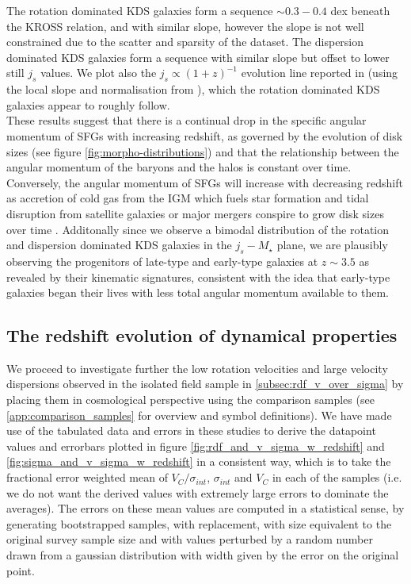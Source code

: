 \documentclass[fleqn,usenatbib]{mn2e}
\begin{document}
The rotation dominated KDS galaxies form a sequence $\sim 0.3-0.4$ dex beneath the KROSS relation, and with similar slope, however the slope is not well constrained due to the scatter and sparsity of the dataset.
The dispersion dominated KDS galaxies form a sequence with similar slope but offset to lower still $j_{s}$ values.
We plot also the $j_{s} \propto (1+z)^{-1}$ evolution line reported in \cite{Swinbank2017} (using the local slope and normalisation from \cite{Romanowsky2012}), which the rotation dominated KDS galaxies appear to roughly follow. \\

These results suggest that there is a continual drop in the specific angular momentum of SFGs with increasing redshift, as governed by the evolution of disk sizes \citep[e.g.][]{Trujillo2007} (see figure \ref{fig:morpho-distributions}) and that the relationship between the angular momentum of the baryons and the halos is constant over time.
Conversely, the angular momentum of SFGs will increase with decreasing redshift as accretion of cold gas from the IGM which fuels star formation and tidal disruption from satellite galaxies or major mergers conspire to grow disk sizes over time \citep{Trujillo2007,Buitrago2008,VanderWel2014a}.
Additonally since we observe a bimodal distribution of the rotation and dispersion dominated KDS galaxies in the $j_{s}-M_{\star}$ plane, we are plausibly observing the progenitors of late-type and early-type galaxies at $z\sim3.5$ as revealed by their kinematic signatures, consistent with the idea that early-type galaxies began their lives with less total angular momentum available to them.


\subsection{The redshift evolution of dynamical properties}\label{subsec:redshift_evolution}
We proceed to investigate further the low rotation velocities and large velocity dispersions observed in the isolated field sample in \cref{subsec:rdf_v_over_sigma} by placing them in cosmological perspective using the comparison samples (see \cref{app:comparison_samples} for overview and symbol definitions).
We have made use of the tabulated data and errors in these studies to derive the datapoint values and errorbars plotted in figure \ref{fig:rdf_and_v_sigma_w_redshift} and \ref{fig:sigma_and_v_sigma_w_redshift} in a consistent way, which is to take the fractional error weighted mean of $V_{C}/\sigma_{int}$, $\sigma_{int}$ and $V_{C}$ in each of the samples (i.e. we do not want the derived values with extremely large errors to dominate the averages).
The errors on these mean values are computed in a statistical sense, by generating bootstrapped samples, with replacement, with size equivalent to the original survey sample size and with values perturbed by a random number drawn from a gaussian distribution with width given by the error on the original point. \\
\end{document}
